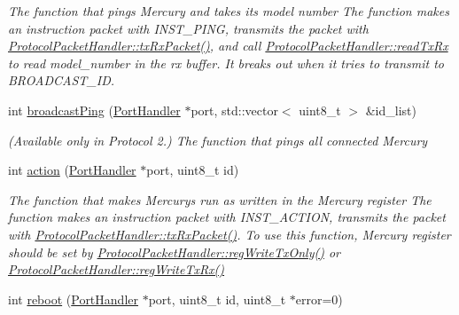 \begin{DoxyCompactItemize}
\begin{DoxyCompactList}\small\item\em The function that pings Mercury and takes its model number  The function makes an instruction packet with I\+N\+S\+T\+\_\+\+P\+I\+NG,  transmits the packet with \hyperlink{classmercury_1_1_protocol_packet_handler_a68b02f23af616886d0795ea12debd613}{Protocol\+Packet\+Handler\+::tx\+Rx\+Packet()},  and call \hyperlink{classmercury_1_1_protocol_packet_handler_a368325ca9c0c783b1e88ef32a4544e51}{Protocol\+Packet\+Handler\+::read\+Tx\+Rx} to read model\+\_\+number in the rx buffer.  It breaks out  when it tries to transmit to B\+R\+O\+A\+D\+C\+A\+S\+T\+\_\+\+ID. \end{DoxyCompactList}\item 
int \hyperlink{classmercury_1_1_protocol_packet_handler_a3cbeb97b8a4a955180a54255a0931d2d}{broadcast\+Ping} (\hyperlink{classmercury_1_1_port_handler}{Port\+Handler} $\ast$port, std\+::vector$<$ uint8\+\_\+t $>$ \&id\+\_\+list)
\begin{DoxyCompactList}\small\item\em (Available only in Protocol 2.) The function that pings all connected Mercury \end{DoxyCompactList}\item 
int \hyperlink{classmercury_1_1_protocol_packet_handler_a55034471e726b363c0a535acb1012468}{action} (\hyperlink{classmercury_1_1_port_handler}{Port\+Handler} $\ast$port, uint8\+\_\+t id)
\begin{DoxyCompactList}\small\item\em The function that makes Mercurys run as written in the Mercury register  The function makes an instruction packet with I\+N\+S\+T\+\_\+\+A\+C\+T\+I\+ON,  transmits the packet with \hyperlink{classmercury_1_1_protocol_packet_handler_a68b02f23af616886d0795ea12debd613}{Protocol\+Packet\+Handler\+::tx\+Rx\+Packet()}.  To use this function, Mercury register should be set by \hyperlink{classmercury_1_1_protocol_packet_handler_af43e9f53d3e295b12b69f4b99c8c1746}{Protocol\+Packet\+Handler\+::reg\+Write\+Tx\+Only()} or \hyperlink{classmercury_1_1_protocol_packet_handler_a314845a3e5d2030e56db2739310ad117}{Protocol\+Packet\+Handler\+::reg\+Write\+Tx\+Rx()} \end{DoxyCompactList}\item 
int \hyperlink{classmercury_1_1_protocol_packet_handler_ada4e23e49d86234efad935480b6886f0}{reboot} (\hyperlink{classmercury_1_1_port_handler}{Port\+Handler} $\ast$port, uint8\+\_\+t id, uint8\+\_\+t $\ast$error=0)

\end{DoxyCompactItemize}
